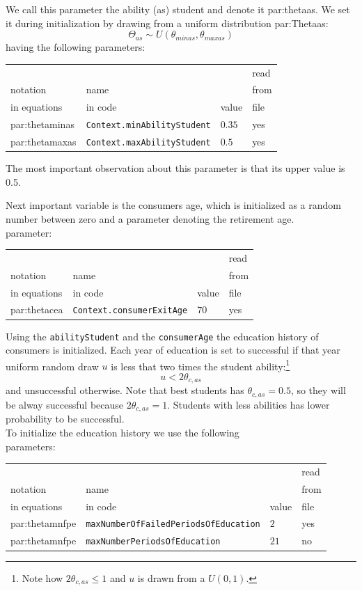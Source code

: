 \documentclass{book}
\begin{document}
We call this parameter the ability (as) student and denote it \gls{par:thetaas}. We set it during initialization by drawing from a uniform distribution \gls{par:Thetaas}:
\[
	\Theta_{as}\sim U(\theta_{minas},\theta_{maxas})
\]
having the following parameters:\\
\begin{tabular}{l l l l}
	\hline
	& &&read\\
	notation& name &&from\\
	in equations& in code&value&file\\
	\hline
	\hline
	\gls{par:thetaminas}&\verb+Context.minAbilityStudent+&$0.35$&yes\\
 \gls{par:thetamaxas}&\verb+Context.maxAbilityStudent+&$0.5$&yes\\
	\hline
\end{tabular}

\vskip5mm
The most important observation about this parameter is that its upper value is 0.5.

Next important variable is the consumers age, which is initialized as a random number between zero and a parameter denoting the retirement age.\\
parameter:\\
\begin{tabular}{l l l l}
	\hline
	& &&read\\
	notation& name &&from\\
	in equations& in code&value&file\\
	\hline
	\hline
\gls{par:thetacea}&\verb+Context.consumerExitAge+&$70$&yes\\
	\hline
\end{tabular}

\vskip5mm
Using the \verb+abilityStudent+ and the \verb+consumerAge+ the education history of consumers is initialized. Each year of education is set to successful if that year uniform random draw $u$ is less that two times the student ability:\footnote{Note how $2\theta_{c,as}\le 1$ and $u$ is drawn from a $U(0,1)$.}
\[
	u<2\theta_{c,as}
\]
and unsuccessful otherwise.  Note that best students has $\theta_{c,as}=0.5$, so they will be alway successful because $2\theta_{c,as}=1$. Students with less abilities has lower probability to be successful.\\

To initialize the education history we use the following\\ 
parameters:\\
\begin{tabular}{l l l l}
	\hline
	& &&read\\
	notation& name &&from\\
	in equations& in code&value&file\\
	\hline
	\hline
\gls{par:thetamnfpe}&\verb+maxNumberOfFailedPeriodsOfEducation+&$2$&yes\\
\gls{par:thetamnfpe}&\verb+maxNumberPeriodsOfEducation+&$21$&no\\
	\hline
\end{tabular}
\end{document}
